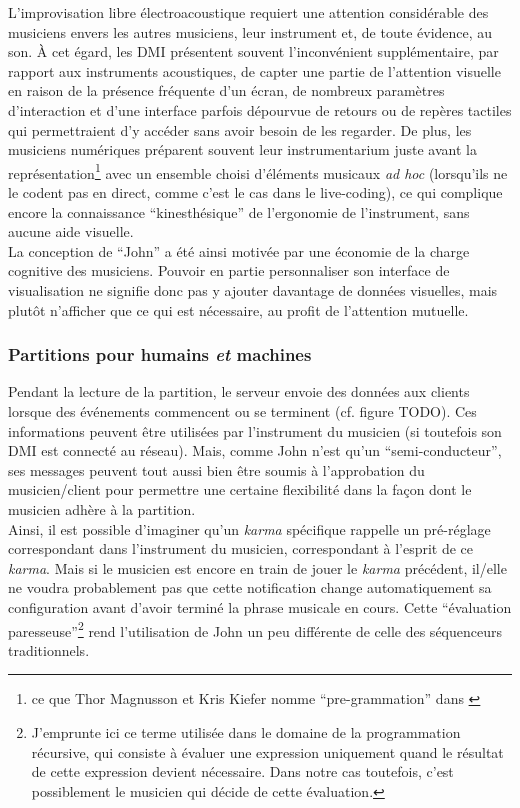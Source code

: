 \noindent L'improvisation libre électroacoustique requiert une attention considérable des musiciens envers les autres musiciens, leur instrument et, de toute évidence, au son. À cet égard, les \gls{DMI} présentent souvent l'inconvénient supplémentaire, par rapport aux instruments acoustiques, de capter une partie de l'attention visuelle en raison de la présence fréquente d'un écran, de nombreux paramètres d'interaction et d'une interface parfois dépourvue de retours ou de repères tactiles qui permettraient d'y accéder sans avoir besoin de les regarder. De plus, les musiciens numériques préparent souvent leur instrumentarium juste avant la représentation\footnote{ce que Thor Magnusson et Kris Kiefer nomme ``pre-grammation'' dans \cite{kiefer_live_2019}} avec un ensemble choisi d'éléments musicaux \textit{ad hoc} (lorsqu'ils ne le codent pas en direct, comme c'est le cas dans le live-coding), ce qui complique encore la connaissance ``kinesthésique'' de l'ergonomie de l'instrument, sans aucune aide visuelle.\\
\indent La conception de ``John'' a été ainsi motivée par une économie de la charge cognitive des musiciens. Pouvoir en partie personnaliser son interface de visualisation ne signifie donc pas y ajouter davantage de données visuelles, mais plutôt n'afficher que ce qui est nécessaire, au profit de l'attention mutuelle.

\subsubsection{Partitions pour humains \emph{et} machines}
\label{sec:notation:score_for_humans_and_machines}

\noindent Pendant la lecture de la partition, le serveur envoie des données aux clients lorsque des événements commencent ou se terminent (cf. figure TODO). Ces informations peuvent être utilisées par l'instrument du musicien (si toutefois son \gls{DMI} est connecté au réseau). Mais, comme John n'est qu'un ``semi-conducteur'', ses messages peuvent tout aussi bien être soumis à l'approbation du musicien/client pour permettre une certaine flexibilité dans la façon dont le musicien adhère à la partition.\\
\indent Ainsi, il est possible d'imaginer qu'un \textit{karma} spécifique rappelle un pré-réglage correspondant dans l'instrument du musicien, correspondant à l'esprit de ce \textit{karma}. Mais si le musicien est encore en train de jouer le \textit{karma} précédent, il/elle ne voudra probablement pas que cette notification change automatiquement sa configuration avant d'avoir terminé la phrase musicale en cours. Cette ``évaluation paresseuse''\footnote{J'emprunte ici ce terme utilisée dans le domaine de la programmation récursive, qui consiste à évaluer une expression uniquement quand le résultat de cette expression devient nécessaire. Dans notre cas toutefois, c'est possiblement le musicien qui décide de cette évaluation.} rend l'utilisation de John un peu différente de celle des séquenceurs traditionnels.

